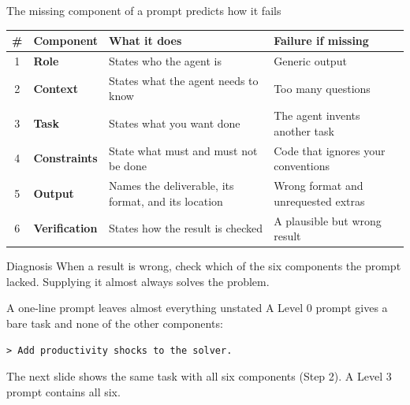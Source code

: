 \documentclass[aspectratio=169,10pt]{beamer}
\newcommand{\filebox}[1]{%
  \vspace{0.5em}\par\noindent{\scriptsize\textcolor{uzhgreydark}{$\triangleright$~\texttt{#1}}}}
\begin{document}
\begin{frame}{The missing component of a prompt predicts how it fails}
\begin{center}
\small
\renewcommand{\arraystretch}{1.35}
\begin{tabular}{@{}c l >{\raggedright\arraybackslash}p{4.8cm} >{\raggedright\arraybackslash}p{4.6cm}@{}}
\toprule
\textbf{\#} & \textbf{Component} & \textbf{What it does} & \textbf{Failure if missing} \\
\midrule
1 & \textbf{Role} & States who the agent is & Generic output \\
2 & \textbf{Context} & States what the agent needs to know & Too many questions \\
3 & \textbf{Task} & States what you want done & The agent invents another task \\
4 & \textbf{Constraints} & State what must and must not be done & Code that ignores your conventions \\
5 & \textbf{Output} & Names the deliverable, its format, and its location & Wrong format and unrequested extras \\
6 & \textbf{Verification} & States how the result is checked & A plausible but wrong result \\
\bottomrule
\end{tabular}
\end{center}

\vspace{0.7em}
\begin{block}{Diagnosis}
When a result is wrong, check which of the six components the prompt lacked. Supplying it almost always solves the problem.
\end{block}
\end{frame}

\begin{frame}[fragile]{A one-line prompt leaves almost everything unstated}
A Level 0 prompt gives a bare task and none of the other components:
\begin{lstlisting}[style=prompt, basicstyle=\normalsize\ttfamily]
> Add productivity shocks to the solver.
\end{lstlisting}

\vspace{1.5em}
The next slide shows the same task with all six components (Step 2). A Level 3 prompt contains all six.
\filebox{code/prompts.md, \S 7}
\end{frame}
\end{document}
